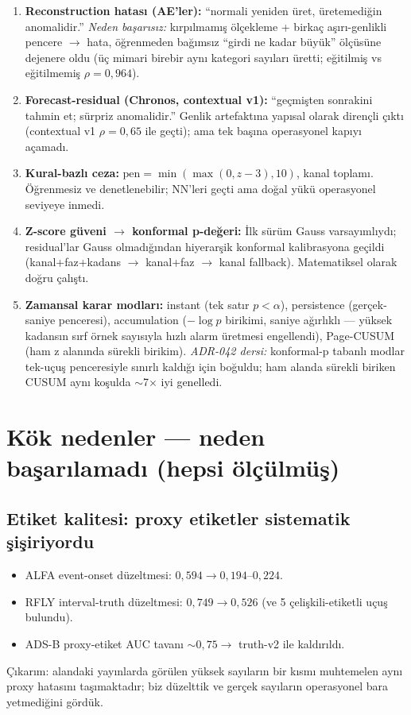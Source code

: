 \documentclass[11pt,a4paper]{article}
\begin{document}
\begin{enumerate}[leftmargin=1.4em,itemsep=3pt]
  \item \textbf{Reconstruction hatası (AE'ler):} ``normali yeniden üret, üretemediğin
  anomalidir.'' \emph{Neden başarısız:} kırpılmamış ölçekleme + birkaç aşırı-genlikli
  pencere $\to$ hata, öğrenmeden bağımsız ``girdi ne kadar büyük'' ölçüsüne dejenere
  oldu (üç mimari birebir aynı kategori sayıları üretti; eğitilmiş vs eğitilmemiş
  $\rho = 0{,}964$).
  \item \textbf{Forecast-residual (Chronos, contextual v1):} ``geçmişten sonrakini
  tahmin et; sürpriz anomalidir.'' Genlik artefaktına yapısal olarak dirençli çıktı
  (contextual v1 $\rho = 0{,}65$ ile geçti); ama tek başına operasyonel kapıyı
  açamadı.
  \item \textbf{Kural-bazlı ceza:} $\mathrm{pen} = \min(\max(0, z-3), 10)$, kanal
  toplamı. Öğrenmesiz ve denetlenebilir; NN'leri geçti ama doğal yükü operasyonel
  seviyeye inmedi.
  \item \textbf{Z-score güveni $\to$ konformal p-değeri:} İlk sürüm Gauss
  varsayımlıydı; residual'lar Gauss olmadığından hiyerarşik konformal kalibrasyona
  geçildi (kanal+faz+kadans $\to$ kanal+faz $\to$ kanal fallback). Matematiksel
  olarak doğru çalıştı.
  \item \textbf{Zamansal karar modları:} instant (tek satır $p<\alpha$), persistence
  (gerçek-saniye penceresi), accumulation ($-\log p$ birikimi, saniye ağırlıklı ---
  yüksek kadansın sırf örnek sayısıyla hızlı alarm üretmesi engellendi), Page-CUSUM
  (ham z alanında sürekli birikim). \emph{ADR-042 dersi:} konformal-p tabanlı modlar
  tek-uçuş penceresiyle sınırlı kaldığı için boğuldu; ham alanda sürekli biriken
  CUSUM aynı koşulda $\sim$7$\times$ iyi genelledi.
\end{enumerate}

\section{Kök nedenler --- neden başarılamadı (hepsi ölçülmüş)}
\label{sec:kok}

\subsection{Etiket kalitesi: proxy etiketler sistematik şişiriyordu}
\begin{itemize}[leftmargin=1.2em,itemsep=1pt]
  \item ALFA event-onset düzeltmesi: $0{,}594 \to 0{,}194$--$0{,}224$.
  \item RFLY interval-truth düzeltmesi: $0{,}749 \to 0{,}526$ (ve 5 çelişkili-etiketli
  uçuş bulundu).
  \item ADS-B proxy-etiket AUC tavanı $\sim0{,}75 \to$ truth-v2 ile kaldırıldı.
\end{itemize}
Çıkarım: alandaki yayınlarda görülen yüksek sayıların bir kısmı muhtemelen aynı
proxy hatasını taşımaktadır; biz düzelttik ve gerçek sayıların operasyonel bara
yetmediğini gördük.
\end{document}
